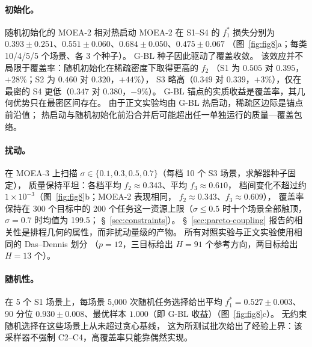 \documentclass[preprint,12pt,authoryear]{elsarticle}
\begin{document}
\paragraph{初始化。}
随机初始化的 MOEA-2 相对热启动 MOEA-2 在 S1--S4 的 $f_1^*$ 损失分别为
$0.393 \pm 0.251$、$0.551 \pm 0.060$、$0.684 \pm 0.050$、$0.475 \pm 0.067$
（图~\ref{fig:fig8}a；每类 10/4/5/5 个场景、各 3 个种子）。
G-BL 种子因此驱动了覆盖收敛。
该效应并不局限于覆盖率：随机初始化在稀疏密度下取得更高的 $f_2$
（S1 为 $0.505$ 对 $0.395$，$+28\%$；S2 为 $0.460$ 对 $0.320$，$+44\%$），
S3 略高（$0.349$ 对 $0.339$，$+3\%$），仅在最密的 S4 更低（$0.347$ 对 $0.380$，$-9\%$）。
G-BL 锚点的实质收益是覆盖率，其几何优势只在最密区间存在。
由于正文实验均由 G-BL 热启动，稀疏区边际是锚点前沿值；
热启动与随机初始化前沿合并后可能超出任一单独运行的质量—覆盖包络。

\paragraph{扰动。}
在 MOEA-3 上扫描 $\sigma\in\{0.1,0.3,0.5,0.7\}$（每档 10 个 S3 场景，求解器种子固定），
质量保持平坦：各档平均 $f_2 \approx 0.343$、平均 $f_3 \approx 0.610$，
档间变化不超过约 $1\times10^{-3}$（图~\ref{fig:fig8}b；MOEA-2 表现相同，
$f_2 \approx 0.343$、$f_3 \approx 0.609$），
覆盖率保持在 300 个目标中的 200 个任务这一资源上限（$\sigma \le 0.5$ 时十个场景全部触顶，$\sigma=0.7$ 时均值为 199.5；
\S~\ref{sec:constraints}）。
\S~\ref{sec:pareto-coupling} 报告的相关性是排程几何的属性，而非扰动量级的产物。
所有对照实验与正文实验使用相同的 Das--Dennis 划分
（$p=12$，三目标给出 $H=91$ 个参考方向，两目标给出 $H=13$ 个）。

\paragraph{随机性。}
在 5 个 S1 场景上，每场景 5{,}000 次随机任务选择给出平均 $f_1^*=0.527 \pm 0.003$、
90 分位 $0.930 \pm 0.008$、最优样本 $1.000$（即 G-BL 收益）（图~\ref{fig:fig8}c）。
无约束随机选择在这些场景上从未超过贪心基线，
这为所测试批次给出了经验上界：该采样器不强制 C2--C4，高覆盖率只能靠偶然实现。
\end{document}
